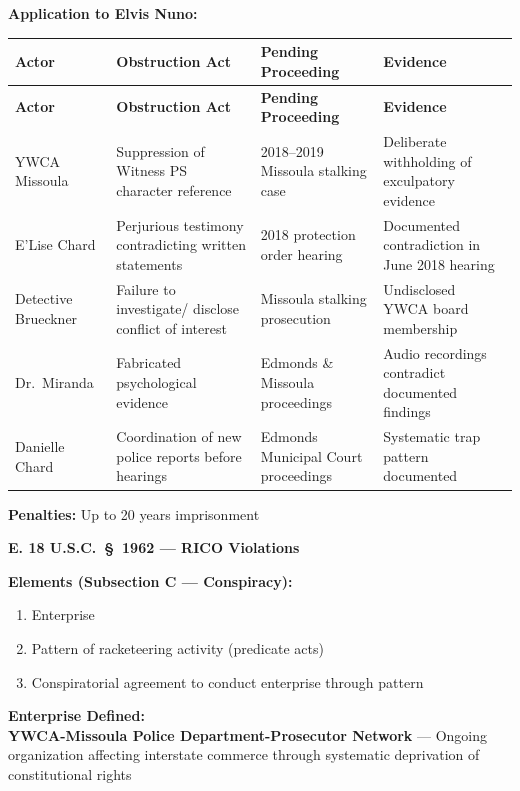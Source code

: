 \documentclass[11pt, letterpaper]{article}
\newcommand{\subsectiontitle}[1]{\vspace{0.15in}\noindent\textcolor{NavyBlue}{\textbf{#1}}\vspace{0.05in}}
\begin{document}
\textbf{Application to Elvis Nuno:}

\begin{center}
\begin{longtable}{|p{1.0in}|p{1.5in}|p{1.3in}|p{1.4in}|}
\hline
\textbf{Actor} & \textbf{Obstruction Act} & \textbf{Pending Proceeding} & \textbf{Evidence} \\
\hline
\endfirsthead
\hline
\textbf{Actor} & \textbf{Obstruction Act} & \textbf{Pending Proceeding} & \textbf{Evidence} \\
\hline
\endhead
YWCA Missoula & Suppression of Witness PS character reference & 2018--2019 Missoula stalking case & Deliberate withholding of exculpatory evidence \\
\hline
E'Lise Chard & Perjurious testimony contradicting written statements & 2018 protection order hearing & Documented contradiction in June 2018 hearing \\
\hline
Detective Brueckner & Failure to investigate/ disclose conflict of interest & Missoula stalking prosecution & Undisclosed YWCA board membership \\
\hline
Dr.\ Miranda & Fabricated psychological evidence & Edmonds \& Missoula proceedings & Audio recordings contradict documented findings \\
\hline
Danielle Chard & Coordination of new police reports before hearings & Edmonds Municipal Court proceedings & Systematic trap pattern documented \\
\hline
\end{longtable}
\end{center}

\textbf{Penalties:} Up to 20 years imprisonment

\subsectiontitle{E. 18 U.S.C.\ \S\ 1962 --- RICO Violations}

\textbf{Elements (Subsection C --- Conspiracy):}
\begin{enumerate}[leftmargin=*,itemsep=2pt]
    \item Enterprise
    \item Pattern of racketeering activity (predicate acts)
    \item Conspiratorial agreement to conduct enterprise through pattern
\end{enumerate}

\textbf{Enterprise Defined:}\\
\textbf{YWCA-Missoula Police Department-Prosecutor Network} --- Ongoing organization affecting interstate commerce through systematic deprivation of constitutional rights
\end{document}
